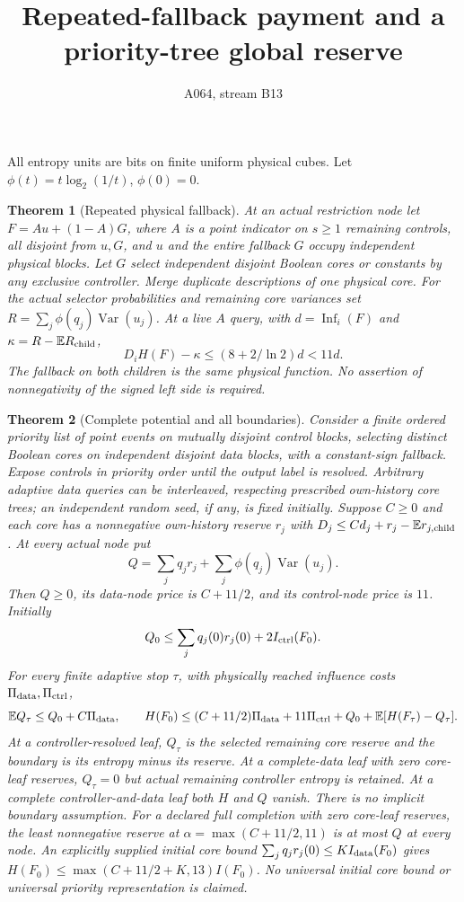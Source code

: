 \documentclass{article}
\newtheorem{theorem}{Theorem}
\begin{document}
\title{Repeated-fallback payment and a priority-tree global reserve}
\author{A064, stream B13}\maketitle
All entropy units are bits on finite uniform physical cubes.
Let $\phi(t)=t\log_2(1/t)$, $\phi(0)=0$.
\begin{theorem}[Repeated physical fallback]
At an actual restriction node let $F=A u+(1-A)G$, where $A$ is a
point indicator on $s\ge1$ remaining controls, all disjoint from $u,G$,
and $u$ and the entire fallback $G$ occupy independent physical blocks.
Let $G$ select independent disjoint Boolean cores or constants by any
exclusive controller. Merge duplicate descriptions of one physical core.
For the actual selector probabilities and remaining core variances set
$R=\sum_j\phi(q_j)\operatorname{Var}(u_j)$.
At a live $A$ query, with $d=\operatorname{Inf}_i(F)$ and
$\kappa=R-\mathbb E R_{\rm child}$,
\[
 D_iH(F)-\kappa\le (8+2/\ln2)d<11d.
\]
The fallback on both children is the same physical function.
No assertion of nonnegativity of the signed left side is required.
\end{theorem}
\begin{theorem}[Complete potential and all boundaries]
Consider a finite ordered priority list of point events on mutually
disjoint control blocks, selecting distinct Boolean cores on independent
disjoint data blocks, with a constant-sign fallback. Expose controls in
priority order until the output label is resolved. Arbitrary adaptive data
queries can be interleaved, respecting prescribed own-history core trees;
an independent random seed, if any, is fixed initially.
Suppose $C\ge0$ and each core has a nonnegative own-history reserve $r_j$
with $D_j\le C d_j+r_j-\mathbb E r_{j,\rm child}$.
At every actual node put
\[
 Q=\sum_jq_jr_j+\sum_j\phi(q_j)\operatorname{Var}(u_j).
\]
Then $Q\ge0$, its data-node price is $C+11/2$, and its control-node
price is $11$. Initially
\[
 Q_0\le\sum_j q_j(0)r_j(0)+2I_{\rm ctrl}(F_0).
\]
For every finite adaptive stop $\tau$, with physically reached influence
costs $\Pi_{\rm data},\Pi_{\rm ctrl}$,
\[
 \mathbb E Q_\tau\le Q_0+C\Pi_{\rm data},\qquad
 H(F_0)\le(C+11/2)\Pi_{\rm data}+11\Pi_{\rm ctrl}
       +Q_0+\mathbb E[H(F_\tau)-Q_\tau].
\]
At a controller-resolved leaf, $Q_\tau$ is the selected remaining core
reserve and the boundary is its entropy minus its reserve. At a
complete-data leaf with zero core-leaf reserves, $Q_\tau=0$ but actual
remaining controller entropy is retained. At a complete controller-and-data
leaf both $H$ and $Q$ vanish. There is no implicit boundary assumption.
For a declared full completion with zero core-leaf reserves, the least
nonnegative reserve at $\alpha=\max(C+11/2,11)$ is at most $Q$ at every
node. An explicitly supplied initial core bound
$\sum_jq_jr_j(0)\le K I_{\rm data}(F_0)$ gives
$H(F_0)\le\max(C+11/2+K,13)I(F_0)$.
No universal initial core bound or universal priority representation is claimed.
\end{theorem}
\end{document}
